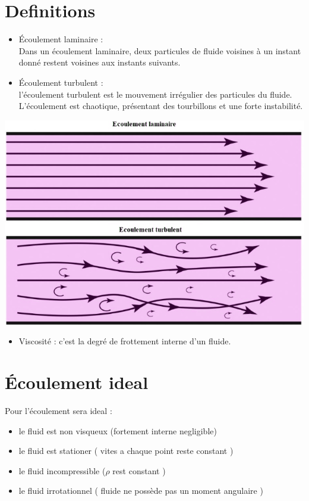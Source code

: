 \documentclass[12pt,oneside]{book}
\begin{document}
\section{Definitions}
\begin{minipage}{0.5\linewidth}
	\begin{itemize}
		\item Écoulement laminaire : \\
		      Dans un écoulement laminaire, deux particules de fluide voisines à un instant donné restent voisines aux instants suivants.
		\item Écoulement turbulent : \\
		      l'écoulement turbulent est le mouvement irrégulier des particules du fluide. L'écoulement est chaotique, présentant des tourbillons et une forte instabilité.
	\end{itemize}
\end{minipage}
\begin{minipage}{0.5\linewidth}
	\includegraphics[width=\linewidth]{../pic/1103/1.png}
\end{minipage}
\begin{itemize}
	\item Viscosité : c'est la degré de frottement interne d'un fluide.
\end{itemize}
\section{Écoulement ideal}
Pour l’écoulement sera ideal :
\begin{itemize}
	\item le fluid est non visqueux (fortement interne negligible)
	\item le fluid est stationer ( vites a chaque point reste constant )
	\item le fluid incompressible ($ \rho $ rest constant  )
	\item le fluid irrotationnel ( fluide ne possède pas un moment angulaire )
\end{itemize}
\end{document}

